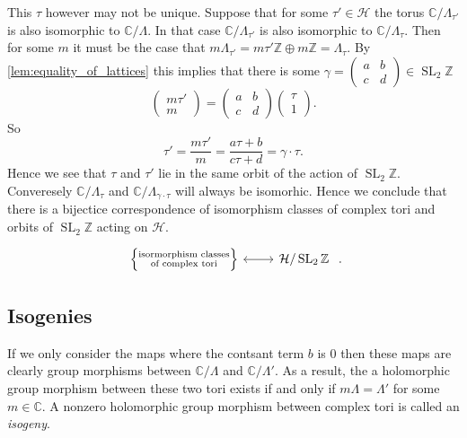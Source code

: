 \documentclass[a4paper]{article}
\theoremstyle{theoremdd}
\theoremstyle{definitiondd}
\theoremstyle{remarkdd}
\newcommand{\Z}{\mathbb{Z}}
\newcommand{\C}{\mathbb{C}}
\DeclareMathOperator{\SL}{SL}
\begin{document}
This $\tau$ however may not be unique. Suppose that for some $\tau' \in \mathcal{H} $ the torus $\C / \Lambda_{\tau'}$ is also isomorphic to $\C / \Lambda$. 
In that case $\C / \Lambda_{\tau'}$ is also isomorphic to $\C / \Lambda_{\tau}$. 
Then for some $m$ it must be the case that $m \Lambda_{\tau'} = m\tau' \Z \oplus m \Z = \Lambda_\tau$. 
By \cref{lem:equality_of_lattices} this implies that there is some $\gamma = \begin{pmatrix} a & b \\ c& d \end{pmatrix}  \in \SL_2\Z$ \[
\begin{pmatrix} m\tau' \\ m \end{pmatrix}  = \begin{pmatrix} a & b \\ c& d \end{pmatrix}  \begin{pmatrix} \tau \\ 1 \end{pmatrix} 
.\] 
So \[
\tau' = \frac{m \tau'}{m} = \frac{a \tau + b}{c \tau + d} = \gamma\cdot \tau
.\] 
Hence we see that $\tau$ and $\tau'$ lie in the same orbit of the action of $\SL_2\Z$. 
Converesely $\C / \Lambda_\tau$ and $\C / \Lambda_{\gamma\cdot \tau}$ will always be isomorhic.
Hence we conclude that there is a bijectice correspondence of isomorphism classes of complex tori and orbits of $\SL_2\Z$ acting on $\mathcal{H} $.\[
\begin{tikzcd}
	\left\{ \substack{\text{isormorphism classes} \\ \text{of complex tori}} \right\} \arrow[r, leftrightarrow] & 
	\mathcal{H} / \SL_2\Z\ 
\end{tikzcd}
.\] 
\subsection{Isogenies}
If we only consider the maps where the contsant term $b$ is $0$ then these maps are clearly group morphisms between $\C / \Lambda$ and  $\C / \Lambda'$. 
As a result, the a holomorphic group morphism between these two tori exists if and only if $m\Lambda = \Lambda'$ for some $m \in \C$. 
A nonzero holomorphic group morphism between complex tori is called an \emph{isogeny}.
\end{document}
